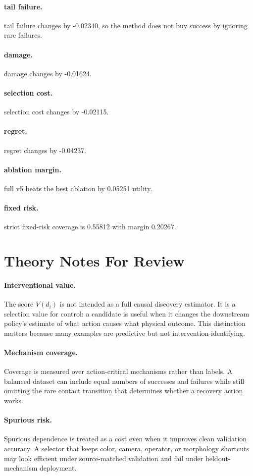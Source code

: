\documentclass{article}
\begin{document}
\paragraph{tail failure.} tail failure changes by -0.02340, so the method does not buy success by ignoring rare failures.
\paragraph{damage.} damage changes by -0.01624.
\paragraph{selection cost.} selection cost changes by -0.02115.
\paragraph{regret.} regret changes by -0.04237.
\paragraph{ablation margin.} full v5 beats the best ablation by 0.05251 utility.
\paragraph{fixed risk.} strict fixed-risk coverage is 0.55812 with margin 0.20267.
\clearpage
\section{Theory Notes For Review}
\paragraph{Interventional value.} The score $V(d_i)$ is not intended as a full causal discovery estimator. It is a selection value for control: a candidate is useful when it changes the downstream policy's estimate of what action causes what physical outcome. This distinction matters because many examples are predictive but not intervention-identifying.
\paragraph{Mechanism coverage.} Coverage is measured over action-critical mechanisms rather than labels. A balanced dataset can include equal numbers of successes and failures while still omitting the rare contact transition that determines whether a recovery action works.
\paragraph{Spurious risk.} Spurious dependence is treated as a cost even when it improves clean validation accuracy. A selector that keeps color, camera, operator, or morphology shortcuts may look efficient under source-matched validation and fail under heldout-mechanism deployment.
\end{document}
